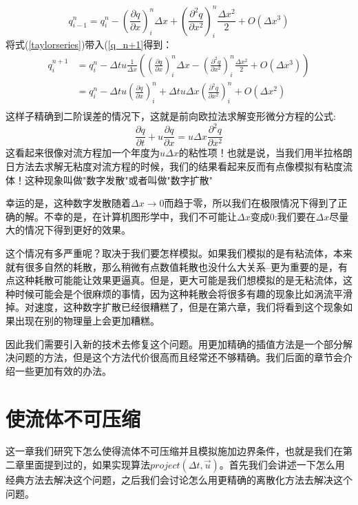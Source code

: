 \documentclass{article}
\begin{document}
\begin{equation}
q^n_{i-1}=q_i^n-\left (\frac{\partial{q}}{\partial{x}}\right)^n_i\Delta{x}+\left(\frac{\partial^2{q}}{\partial{x}^2}\right)^n_i\frac{\Delta{x}^2}{2}+O(\Delta{x}^3) \label{taylorseries}
\end{equation}
将式(\ref{taylorseries})带入(\ref{q_n+1}得到：
\begin{equation}
\begin{aligned}
q_i^{n+1}&=q_i^n-\Delta{t}u\frac{1}{\Delta{x}}\left(\left(\frac{\partial{q}}{\partial{x}}\right)^n_i\Delta{x}-\left(\frac{\partial^2{q}}{\partial{x}^2}\right)^n_i\frac{\Delta{x}^2}{2}+O(\Delta{x^3})\right) \\
&=q_i^n-\Delta{t}u\left(\frac{\partial{q}}{\partial{x}}\right)^n_i+\Delta{t}u\Delta{x}\left(\frac{\partial^2{q}}{\partial{x}^2}\right)^n_i+O(\Delta{x}^2) \\
\end{aligned}
\end{equation}
这样子精确到二阶误差的情况下，这就是前向欧拉法求解变形微分方程的公式:
\begin{equation}
\frac{\partial{q}}{\partial{t}}+u\frac{\partial{q}}{\partial{x}}=u\Delta{x}\frac{\partial^2{q}}{\partial{x}^2}
\end{equation}
这看起来很像对流方程加一个年度为$u\Delta{x}$的粘性项！也就是说，当我们用半拉格朗日方法去求解无粘度对流方程的时候，我们的结果看起来反而有点像模拟有粘度流体！这种现象叫做"数字发散"或者叫做"数字扩散"
\par
幸运的是，这种数字发散随着$\Delta{x}\to{0}$而趋于零，所以我们在极限情况下得到了正确的解。不幸的是，在计算机图形学中，我们不可能让$\Delta{x}$变成0:我们要在$\Delta{x}$尽量大的情况下得到更好的效果。
\par
这个情况有多严重呢？取决于我们要怎样模拟。如果我们模拟的是有粘流体，本来就有很多自然的耗散，那么稍微有点数值耗散也没什么大关系--更为重要的是，有点这种耗散可能能让效果更逼真。但是，更大可能是我们想模拟的是无粘流体，这种时候可能会是个很麻烦的事情，因为这种耗散会将很多有趣的现象比如涡流平滑掉。对速度，这种数字扩散已经很糟糕了，但是在第六章，我们将看到这个现象如果出现在别的物理量上会更加糟糕。
\par
因此我们需要引入新的技术去修复这个问题。用更加精确的插值方法是一个部分解决问题的方法，但是这个方法代价很高而且经常还不够精确。我们后面的章节会介绍一些更加有效的办法。
\section{使流体不可压缩}
这一章我们研究下怎么使得流体不可压缩并且模拟施加边界条件，也就是我们在第二章里面提到过的，如果实现算法$project(\Delta t,\vec{u})$。首先我们会讲述一下怎么用经典方法去解决这个问题，之后我们会讨论怎么用更精确的离散化方法去解决这个问题。
\end{document}
